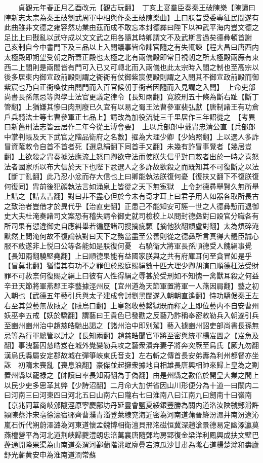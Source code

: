 　　貞觀元年春正月乙酉改元【觀古玩翻】　丁亥上宴羣臣奏秦王破陳樂【陳讀曰陣新志太宗為秦王破劉武周軍中相與作秦王破陳樂曲】上曰朕昔受委專征民間遂有此曲雖非文德之雍容然功業由茲而成不敢忘本封德彞曰陛下以神武平海内豈文德之足比上曰戡亂以武守成以文文武之用各隨其時卿謂文不及武斯言過矣德彝頓首謝　己亥制自今中書門下及三品以上入閤議事皆命諫官隨之有失輒諫【程大昌曰唐西内太極殿即朔望受朝之所蓋正殿也太極之北有兩儀殿即常日視朝之所太極殿兩廡有東西二上閤則是兩閤皆有門可入已又可轉北而入兩儀也此太宗時入閤之制也至高宗以後多居東内御宣政前殿則謂之衙衙有仗御紫宸便殿則謂之入閤其不御宣政前殿而御紫宸也乃自正衙喚仗由閤門而入百官候朝于衙者因隨而入見謂之入閤】　上命吏部尚書長孫無忌等與學士法官更議定律令【長知兩翻】寛絞刑五十條為斷右趾【斷丁管翻】上猶嫌其慘曰肉刑廢已久宜有以易之蜀王法曹參軍裴弘獻【唐制諸王有功倉戶兵騎法士等七曹參軍正七品上】請改為加役流徙三千里居作三年詔從之　【考異曰新舊刑法志皆云居作二年今從王溥會要】　上以兵部郎中戴胄忠清公直【兵部郎中掌判帳及天下武官之階品衛府之名數】擢為大理少卿【少始照翻】上以選人多詐冒資䕃敕令自首不首者死【選息絹翻下同首手又翻】未幾有詐冒事覺者【幾居豈翻】上欲殺之胄奏據法應流上怒曰卿欲守法而使朕失信乎對曰敕者出於一時之喜怒法者國家所以布大信於天下也陛下忿選人之多詐故欲殺之而既知其不可復斷之以法【斷丁亂翻】此乃忍小忿而存大信也上曰卿能執法朕復何憂【復扶又翻下不復朕復何復同】胄前後犯顔執法言如涌泉上皆從之天下無寃獄　上令封德彞舉賢久無所舉上詰之【詰去吉翻】對曰非不盡心但於今未有奇才耳上曰君子用人如器各取所長古之致治者豈借才於異代乎【治直吏翻】正患己不能知安可誣一世之人德彝慙而退御史大夫杜淹奏諸司文案恐有稽失請令御史就司檢校上以問封德彝對曰設官分職各有所司果有愆違御史自應糾舉若徧歷諸司搜摘疵纇【摘他狄翻纇盧對翻】太為煩碎淹默然上問淹何故不復論執對曰天下之務當盡至公善則從之德彝所言真得大體臣誠心服不敢遂非上悦曰公等各能如是朕復何憂　右驍衛大將軍長孫順德受人餽絹事覺【長知兩翻驍堅堯翻】上曰順德果能有益國家朕與之共有府庫耳何至貪冒如是乎【冒莫北翻】猶惜其有功不之罪但於殿庭賜絹數十匹大理少卿胡演曰順德枉法受財罪不可赦柰何復賜之絹上曰彼有人性得絹之辱甚於受刑如不知愧一禽獸耳殺之何益　辛丑天節將軍燕郡王李藝據涇州反【宜州道為天節軍置將軍一人燕因肩翻】藝之初入朝也【武德五年藝引兵與太子建成會討劉黑闥遂入朝朝直遙翻】恃功驕倨秦王左右至其營藝無故敺之【敺烏口翻】上皇怒收藝繫獄既而釋之上即位藝内不自安曹州妖巫李五戒【妖於驕翻】謂藝曰王貴色已發勸之反藝乃詐稱奉密敕勒兵入朝遂引兵至豳州豳州治中趙慈皓馳出謁之【諸州治中即别駕】藝入據豳州詔吏部尚書長孫無忌等為行軍總管以討之【長知兩翻】趙慈皓聞官軍將至密與統軍楊岌圖之【岌魚及翻】事洩藝囚慈皓岌在城外覺變勒兵攻之藝衆潰弃妻子將奔突厥至烏氏【厥九勿翻漢烏氏縣屬安定郡故城在彈箏峽東氏音支】左右斬之傳首長安弟夀為利州都督亦坐誅　初隋末喪亂【喪息浪翻】豪傑並起擁衆據地自相雄長唐興相帥來歸上皇為之割置州縣以寵禄之【帥讀曰率長知兩翻為于偽翻】由是州縣之數倍於開皇大業之間上以民少吏多思革其弊【少詩沼翻】二月命大加併省因山川形便分為十道一曰關内二曰河南三曰河東四曰河北五曰山南六曰隴右七曰淮南八曰江南九曰劒南十曰嶺南【京兆同華商岐邠隴涇原寧慶鄜坊丹延靈會鹽夏綏銀豐勝為關内道洛汝陜虢鄭滑許潁陳蔡汴宋亳徐濠宿鄆齊曹濮青淄登萊棣兖海近密為河南道蒲晉絳汾濕并南汾遼沁嵐石忻代朔蔚澤潞為河東道懷孟魏博相衛澶貝邢洺磁恒冀深趙滄景德易定幽涿瀛莫燕檀營平為河北道荆峽歸夔澧朗忠涪萬襄唐隨鄧均房郢復金梁洋利鳳興成扶文壁巴蓬通開隆果渠為山南道秦渭河鄯蘭階洮岷廓疊宕涼瓜沙甘肅為隴右道楊楚滁和夀廬舒光蘄黄安申為淮南道潤常蘇